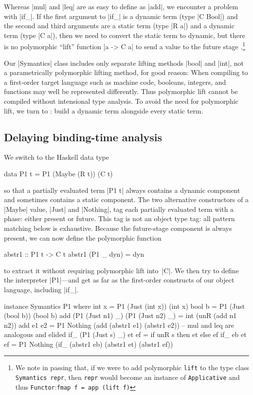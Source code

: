 \documentclass[preprint]{sigplanconf}
\begin{document}
Whereas |mul| and |leq| are as easy to define as |add|, we encounter
a problem with |if_|.  If the first argument to |if_| is a dynamic term
(type |C Bool|) and the second and third arguments are a static term
(type |R a|) and a dynamic term (type |C a|), then we need to convert
the static term to dynamic, but there is no polymorphic ``lift''
function |a -> C a| to send a value to the future stage
\citep{xi-guarded,WalidPOPL03}.\footnote{We note in passing that, if we
were to add polymorphic \texttt{lift} to the type class
\texttt{Symantics repr}, then \texttt{repr} would become an instance of
\texttt{Applicative} and thus \texttt{Functor}:\quad\texttt{fmap
f = app (lift f)}}

Our |Symantics| class includes only separate lifting methods |bool| and
|int|, not a parametrically polymorphic lifting method, for good reason:
When compiling to a first-order target language such as machine code,
booleans, integers, and functions may well be represented differently.
Thus polymorphic lift cannot be compiled without intensional type
analysis.  To avoid the need for polymorphic lift, we turn to
\citet[see also \citealp{sumii-hybrid}]{asai-binding-time}:
build a dynamic term
alongside every static term.

\subsection{Delaying binding-time analysis}
\label{S:PE-problem}

We switch to the Haskell data type
\begin{code}
data P1 t = P1 (Maybe (R t)) (C t)
\end{code}
so that a partially evaluated term |P1 t| always contains a dynamic
component and sometimes contains a static component.  The two
alternative constructors of a |Maybe| value, |Just| and |Nothing|,
tag each partially evaluated term with a phase: either present or
future.  This tag is not an object type tag: all pattern matching below
is exhaustive.  Because the future-stage component is always present, we
can now define the polymorphic function
\begin{code}
abstr1 :: P1 t -> C t
abstr1 (P1 _ dyn) = dyn
\end{code}
to extract it without requiring polymorphic lift into~|C|.  We then try
to define the interpreter |P1|---and get as far as the first-order
constructs of our object language, including |if_|.
\begin{code}
instance Symantics P1 where
  int  x = P1 (Just (int x)) (int x)
  bool b = P1 (Just (bool b)) (bool b)
  add (P1 (Just n1) _) (P1 (Just n2) _)
    = int (unR (add n1 n2))
  add e1 e2 = P1 Nothing
    (add (abstr1 e1) (abstr1 e2))
  -- mul and leq are analogous and elided
  if_ (P1 (Just s) _) et ef
    = if unR s then et else ef
  if_ eb et ef = P1 Nothing
    (if_ (abstr1 eb) (abstr1 et) (abstr1 ef))
\end{code}
\end{document}
